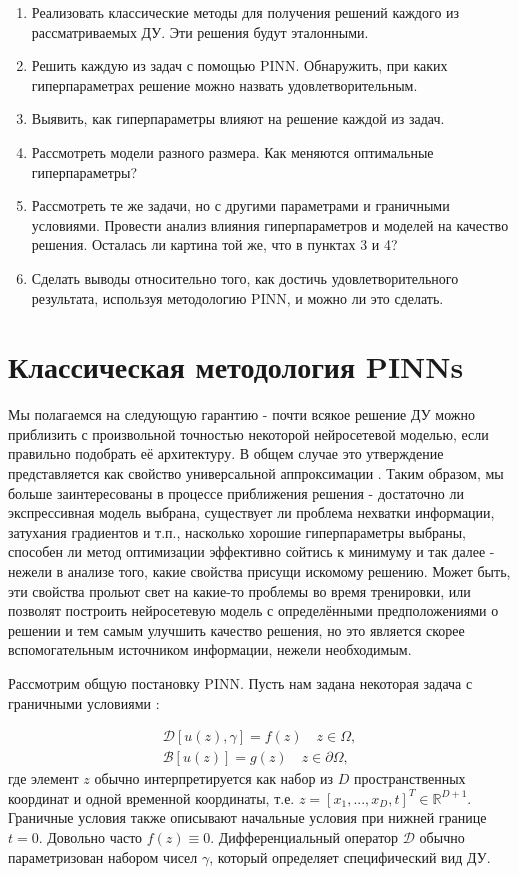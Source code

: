\documentclass[a4paper, 12pt]{article}
\begin{document}
\begin{enumerate}
    \item Реализовать классические методы для получения решений каждого из рассматриваемых ДУ. Эти решения будут эталонными.
    \item Решить каждую из задач с помощью PINN. Обнаружить, при каких гиперпараметрах решение можно назвать удовлетворительным.
    \item Выявить, как гиперпараметры влияют на решение каждой из задач.
    \item Рассмотреть модели разного размера. Как меняются оптимальные гиперпараметры?
    \item Рассмотреть те же задачи, но с другими параметрами и граничными условиями. Провести анализ влияния гиперпараметров и моделей на качество решения. Осталась ли картина той же, что в пунктах 3 и 4?
    \item Сделать выводы относительно того, как достичь удовлетворительного результата, используя методологию PINN, и можно ли это сделать.
\end{enumerate}

\section{Классическая методология PINNs} \label{section:pinn}

Мы полагаемся на следующую гарантию - почти всякое решение ДУ можно приблизить с произвольной точностью некоторой нейросетевой моделью, если правильно подобрать её архитектуру. В общем случае это утверждение представляется как свойство универсальной аппроксимации \cite{Kratsios2021}. Таким образом, мы больше заинтересованы в процессе приближения решения - достаточно ли экспрессивная модель выбрана, существует ли проблема нехватки информации, затухания градиентов и т.п., насколько хорошие гиперпараметры выбраны, способен ли метод оптимизации эффективно сойтись к минимуму и так далее - нежели в анализе того, какие свойства присущи искомому решению. Может быть, эти свойства прольют свет на какие-то проблемы во время тренировки, или позволят построить нейросетевую модель с определёнными предположениями о решении и тем самым улучшить качество решения, но это является скорее вспомогательным источником информации, нежели необходимым.

Рассмотрим общую постановку PINN. Пусть нам задана некоторая задача с граничными условиями \cite{Cuomo2022}:

\begin{equation*}
\begin{gathered}
    \mathcal{D}[u(z), \gamma] = f(z) \quad z \in \Omega, \\
    \mathcal{B}[u(z)] = g(z) \quad z \in \partial \Omega,
\end{gathered}
\end{equation*}
где элемент $z$ обычно интерпретируется как набор из $D$ пространственных координат и одной временной координаты, т.е. $z = [x_1, ..., x_D, t]^T \in \mathbb{R}^{D + 1}$. Граничные условия также описывают начальные условия при нижней границе $t = 0$. Довольно часто $f(z) \equiv 0$. Дифференциальный оператор $\mathcal{D}$ обычно параметризован набором чисел $\gamma$, который определяет специфический вид ДУ.
\end{document}
